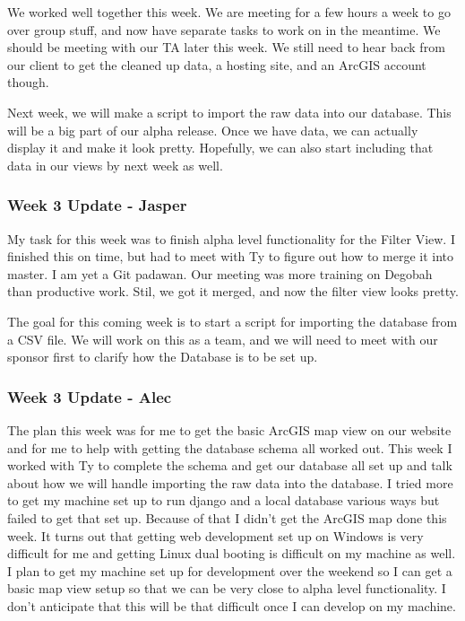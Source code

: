 We worked well together this week.
We are meeting for a few hours a week to go over group stuff, and now have separate tasks to work on in the meantime.
We should be meeting with our TA later this week.
We still need to hear back from our client to get the cleaned up data, a hosting site, and an ArcGIS account though.

Next week, we will make  a script to import the raw data into our database.
This will be a big part of our alpha release.
Once we have data, we can actually display it and make it look pretty.
Hopefully, we can also start including that data in our views by next week as well.

\subsubsection{Week 3 Update - Jasper}
My task for this week was to finish alpha level functionality for the Filter View.
I finished this on time, but had to meet with Ty to figure out how to merge it into master.
I am yet a Git padawan.
Our meeting was more training on Degobah than productive work.
Stil, we got it merged, and now the filter view looks pretty.

The goal for this coming week is to start a script for importing the database from a CSV file.
We will work on this as a team, and we will need to meet with our sponsor first to clarify how the Database is to be set up.

\subsubsection{Week 3 Update - Alec}
The plan this week was for me to get the basic ArcGIS map view on our website and for me to help with getting the database schema all worked out.
This week I worked with Ty to complete the schema and get our database all set up and talk about how we will handle importing the raw data into the database.
I tried more to get my machine set up to run django and a local database various ways but failed to get that set up.
Because of that I didn't get the ArcGIS map done this week.
It turns out that getting web development set up on Windows is very difficult for me and getting Linux dual booting is difficult on my machine as well.
I plan to get my machine set up for development over the weekend so I can get a basic map view setup so that we can be very close to alpha level functionality.
I don't anticipate that this will be that difficult once I can develop on my machine.


